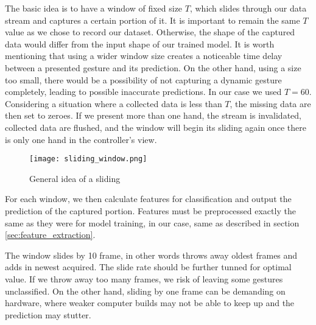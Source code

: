 The basic idea is to have a window of fixed size $T$, which slides through our data stream and captures a certain portion of it. It is important to remain the same $T$ value as we chose to record our dataset. Otherwise, the shape of the captured data would differ from the input shape of our trained model. It is worth mentioning that using a wider window size creates a noticeable time delay between a presented gesture and its prediction. On the other hand, using a size too small, there would be a possibility of not capturing a dynamic gesture completely, leading to possible inaccurate predictions. In our case we used $T = 60$. Considering a situation where a collected data is less than $T$, the missing data are then set to zeroes. If we present more than one hand, the stream is invalidated, collected data are flushed, and the window will begin its sliding again once there is only one hand in the controller's view.

\begin{figure}[ht]
	\centering
    \texttt{[image: sliding\_window.png]}
	\caption{General idea of a sliding \cite{sliding_window_img}}
	\label{fig:sliding_window}
\end{figure}

For each window, we then calculate features for classification and output the prediction of the captured portion. Features must be preprocessed exactly the same as they were for model training, in our case, same as described in section \ref{sec:feature_extraction}. 

The window slides by 10 frame, in other words throws away oldest frames and adds in newest acquired. The slide rate should be further tunned for optimal value. If we throw away too many frames, we risk of leaving some gestures unclassified. On the other hand, sliding by one frame can be demanding on hardware, where weaker computer builds may not be able to keep up and the prediction may stutter.

